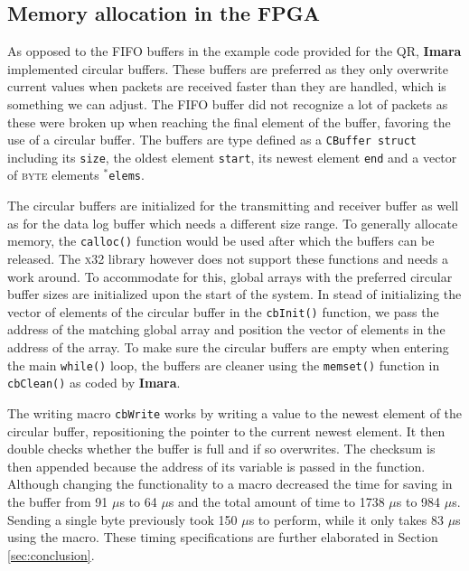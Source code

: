 \documentclass{article}
\begin{document}
\subsection{Memory allocation in the FPGA}
As opposed to the FIFO buffers in the example code provided for the QR, \textbf{Imara} implemented circular buffers. These buffers are preferred as they only overwrite current values when packets are received faster than they are handled, which is something we can adjust. The FIFO buffer did not recognize a lot of packets as these were broken up when reaching the final element of the buffer, favoring the use of a circular buffer. The buffers are type defined as a \texttt{CBuffer struct} including its \texttt{size}, the oldest element \texttt{start}, its newest element \texttt{end} and a vector of \textsc{byte} elements \texttt{$^*$elems}.

The circular buffers are initialized for the transmitting and receiver buffer as well as for the data log buffer which needs a different size range. To generally allocate memory, the \texttt{calloc()} function would be used after which the buffers can be released. The \textsc{x32} library however does not support these functions and needs a work around. To accommodate for this, global arrays with the preferred circular buffer sizes are initialized upon the start of the system. In stead of initializing the vector of elements of the circular buffer in the \texttt{cbInit()} function, we pass the address of the matching global array and position the vector of elements in the address of the array.  To make sure the circular buffers are empty when entering the main \texttt{while()} loop, the buffers are cleaner using the \texttt{memset()} function in \texttt{cbClean()} as coded by \textbf{Imara}.

The writing macro \texttt{cbWrite} works by writing a value to the newest element of the circular buffer, repositioning the pointer to the current newest element. It then double checks whether the buffer is full and if so overwrites. The checksum is then appended because the address of its variable is passed in the function. Although changing the functionality to a macro decreased the time for saving in the buffer from 91 $\mu$s to 64 $\mu$s and the total amount of time to 1738 $\mu$s to 984 $\mu$s. Sending a single byte previously took 150 $\mu$s to perform, while it only takes 83 $\mu$s using the macro. These timing specifications are further elaborated in Section \ref{sec:conclusion}.

\end{document}
